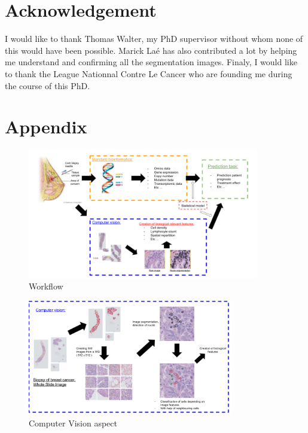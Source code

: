 \documentclass[a4paper,10pt,twocolumn]{article}
\begin{document}
\section*{Acknowledgement}
I would like to thank Thomas Walter, my PhD supervisor without 
whom none of this would have been possible. Marick Laé has also 
contributed a lot by helping me understand and confirming all the 
segmentation images. Finaly, I would like to thank the League 
Nationnal Contre Le Cancer who are founding me during the 
course of this PhD.

 



%
{\footnotesize
}
\newpage


\onecolumn

\section*{Appendix}

 \begin{figure}[!ht]
\centering
\includegraphics[width=0.9\textwidth]{Whatido.png}
\caption{Workflow}
\label{workflow1}
\end{figure}


\begin{figure}[!ht]
\centering
\includegraphics[width=0.8\textwidth]{ComputerVision.png}
\caption{Computer Vision aspect}
\label{fig:ComputerVision}
\end{figure}
\end{document}
